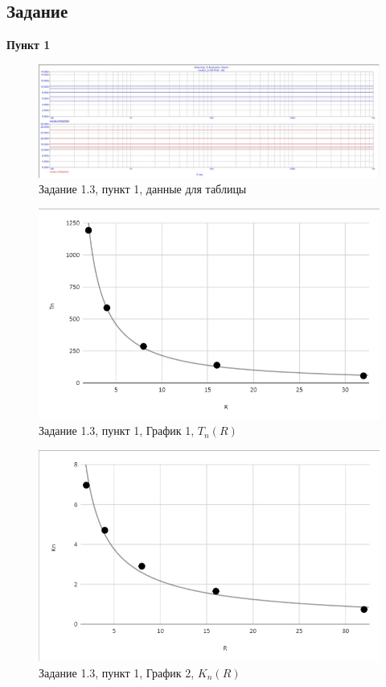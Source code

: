 \documentclass[a4paper, 14pt]{extarticle}%
\begin{document}
\subsection{Задание}
\textbf{Пункт 1}
\begin{figure}[h!]
			\centering
			\includegraphics[width=1.1\linewidth]{1.3/pic8.jpg}
			\caption{Задание 1.3, пункт 1, данные для таблицы}
			\label{A}
\end{figure}

\begin{figure}[h!]
			\centering
			\includegraphics[width=1.1\linewidth]{1.3/pic9.jpg}
			\caption{Задание 1.3, пункт 1, График 1, $T_n(R)$}
			\label{A}
\end{figure}

\begin{figure}[h!]
			\centering
			\includegraphics[width=1.1\linewidth]{1.3/pic10.jpg}
			\caption{Задание 1.3, пункт 1, График 2, $K_n(R)$}
			\label{A}
\end{figure}
\end{document}
